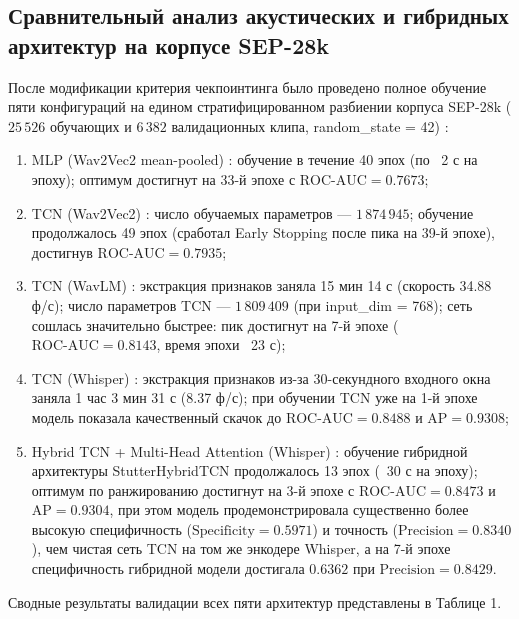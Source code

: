 \documentclass[a4paper,14pt]{extarticle}
\begin{document}
	\subsection{Сравнительный анализ акустических и гибридных архитектур на корпусе SEP-28k}
	После модификации критерия чекпоинтинга было проведено полное обучение пяти конфигураций на едином стратифицированном разбиении корпуса SEP-28k ($25\,526$ обучающих и $6\,382$ валидационных клипа, random\_state = 42) \cite{sep28k}:
	\begin{enumerate}
		\item MLP (Wav2Vec2 mean-pooled) \cite{wav2vec}: обучение в течение 40 эпох (по ~2 с на эпоху); оптимум достигнут на 33-й эпохе с $\text{ROC-AUC} = 0.7673$;
		\item TCN (Wav2Vec2) \cite{wav2vec, tcn}: число обучаемых параметров — $1\,874\,945$; обучение продолжалось 49 эпох (сработал Early Stopping после пика на 39-й эпохе), достигнув $\text{ROC-AUC} = 0.7935$;
		\item TCN (WavLM) \cite{wavlm, tcn}: экстракция признаков заняла 15 мин 14 с (скорость 34.88 ф/с); число параметров TCN — $1\,809\,409$ (при input\_dim = 768); сеть сошлась значительно быстрее: пик достигнут на 7-й эпохе ($\text{ROC-AUC} = 0.8143$, время эпохи ~23 с);
		\item TCN (Whisper) \cite{whisper, tcn}: экстракция признаков из-за 30-секундного входного окна заняла 1 час 3 мин 31 с (8.37 ф/с); при обучении TCN уже на 1-й эпохе модель показала качественный скачок до $\text{ROC-AUC} = 0.8488$ и $\text{AP} = 0.9308$;
		\item Hybrid TCN + Multi-Head Attention (Whisper) \cite{whisper, tcn}: обучение гибридной архитектуры StutterHybridTCN продолжалось 13 эпох (~30 с на эпоху); оптимум по ранжированию достигнут на 3-й эпохе с $\text{ROC-AUC} = 0.8473$ и $\text{AP} = 0.9304$, при этом модель продемонстрировала существенно более высокую специфичность ($\text{Specificity} = 0.5971$) и точность ($\text{Precision} = 0.8340$), чем чистая сеть TCN на том же энкодере Whisper, а на 7-й эпохе специфичность гибридной модели достигала $0.6362$ при $\text{Precision} = 0.8429$.
	\end{enumerate}
	
	Сводные результаты валидации всех пяти архитектур представлены в Таблице 1.
	
\end{document}
